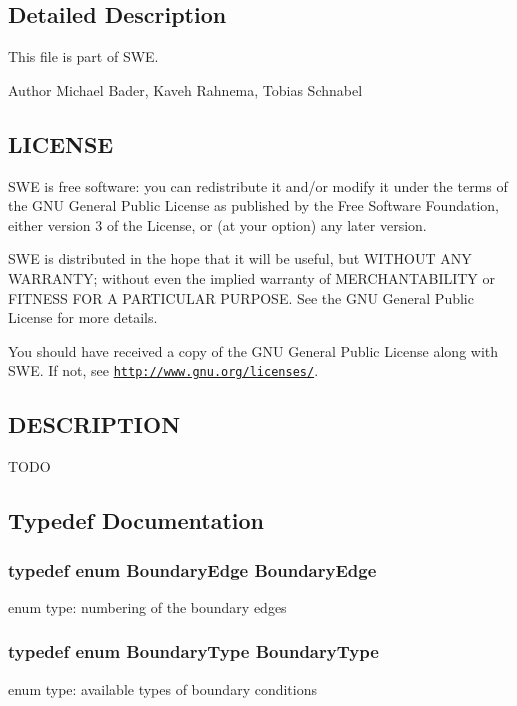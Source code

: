 \subsection{Detailed Description}
This file is part of S\-W\-E.

\begin{DoxyAuthor}{Author}
Michael Bader, Kaveh Rahnema, Tobias Schnabel
\end{DoxyAuthor}
\hypertarget{Writer_8hh_LICENSE}{}\subsection{L\-I\-C\-E\-N\-S\-E}\label{Writer_8hh_LICENSE}
S\-W\-E is free software\-: you can redistribute it and/or modify it under the terms of the G\-N\-U General Public License as published by the Free Software Foundation, either version 3 of the License, or (at your option) any later version.

S\-W\-E is distributed in the hope that it will be useful, but W\-I\-T\-H\-O\-U\-T A\-N\-Y W\-A\-R\-R\-A\-N\-T\-Y; without even the implied warranty of M\-E\-R\-C\-H\-A\-N\-T\-A\-B\-I\-L\-I\-T\-Y or F\-I\-T\-N\-E\-S\-S F\-O\-R A P\-A\-R\-T\-I\-C\-U\-L\-A\-R P\-U\-R\-P\-O\-S\-E. See the G\-N\-U General Public License for more details.

You should have received a copy of the G\-N\-U General Public License along with S\-W\-E. If not, see \href{http://www.gnu.org/licenses/}{\tt http\-://www.\-gnu.\-org/licenses/}.\hypertarget{NetCdfWriter_8hh_DESCRIPTION}{}\subsection{D\-E\-S\-C\-R\-I\-P\-T\-I\-O\-N}\label{NetCdfWriter_8hh_DESCRIPTION}
T\-O\-D\-O 

\subsection{Typedef Documentation}
\hypertarget{SWE__Scenario_8hh_a53b43e70a19e542b4c1ab2da9c6bcc0e}{
\subsubsection[{Boundary\-Edge}]{\setlength{\rightskip}{0pt plus 5cm}typedef enum {\bf Boundary\-Edge}  {\bf Boundary\-Edge}}}\label{SWE__Scenario_8hh_a53b43e70a19e542b4c1ab2da9c6bcc0e}
enum type\-: numbering of the boundary edges \hypertarget{SWE__Scenario_8hh_a0076a482278ddc13ed179c6c76c9b5ad}{
\subsubsection[{Boundary\-Type}]{\setlength{\rightskip}{0pt plus 5cm}typedef enum {\bf Boundary\-Type}  {\bf Boundary\-Type}}}\label{SWE__Scenario_8hh_a0076a482278ddc13ed179c6c76c9b5ad}
enum type\-: available types of boundary conditions 

